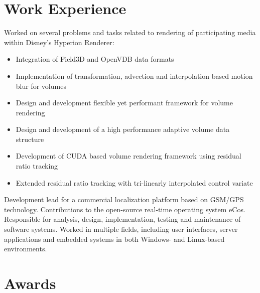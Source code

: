 \documentclass[10pt,a4paper,sans]{moderncv}
\begin{document}
\section{Work Experience}
{
Worked on several problems and tasks related to rendering of participating media within Disney's Hyperion Renderer:
\begin{itemize}
\item Integration of Field3D and OpenVDB data formats
\item Implementation of transformation, advection and interpolation based motion blur for volumes
\item Design and development flexible yet performant framework for volume rendering
\item Design and development of a high performance adaptive volume data structure
\end{itemize}
}
{
\begin{itemize}
\item Development of CUDA based volume rendering framework using residual ratio tracking
\item Extended residual ratio tracking with tri-linearly interpolated control variate
\end{itemize}
}
{
Development lead for a commercial localization platform based on GSM/GPS technology. Contributions to the open-source real-time operating system eCos.
}
{
Responsible for analysis, design, implementation, testing and maintenance of software systems. Worked in multiple fields, including user interfaces, server applications and embedded systems in both Windows- and Linux-based environments.
}


\section{Awards}
\end{document}
